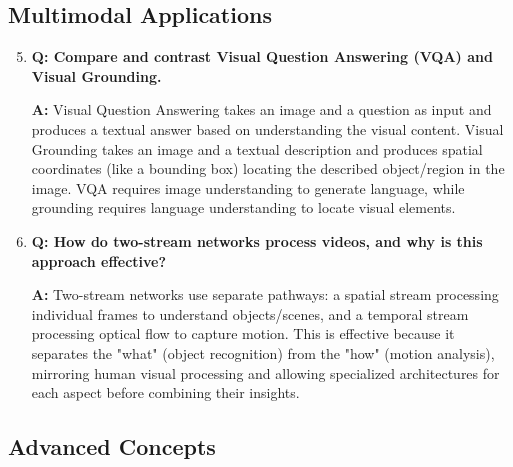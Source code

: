 \subsection*{Multimodal Applications}

\begin{enumerate}
    \setcounter{enumi}{4}
    \item \textbf{Q: Compare and contrast Visual Question Answering (VQA) and Visual Grounding.}
    
    \textbf{A:} Visual Question Answering takes an image and a question as input and produces a textual answer based on understanding the visual content. Visual Grounding takes an image and a textual description and produces spatial coordinates (like a bounding box) locating the described object/region in the image. VQA requires image understanding to generate language, while grounding requires language understanding to locate visual elements.

    \item \textbf{Q: How do two-stream networks process videos, and why is this approach effective?}
    
    \textbf{A:} Two-stream networks use separate pathways: a spatial stream processing individual frames to understand objects/scenes, and a temporal stream processing optical flow to capture motion. This is effective because it separates the "what" (object recognition) from the "how" (motion analysis), mirroring human visual processing and allowing specialized architectures for each aspect before combining their insights.
\end{enumerate}

\subsection*{Advanced Concepts}

